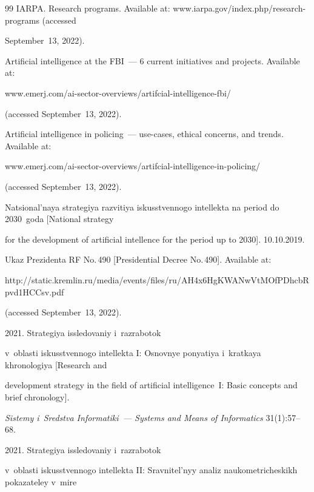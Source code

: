 {{\begin{thebibliography}{99}
IARPA. Research programs. Available at: {\sf www.iarpa.gov/index.php/research-programs} (accessed 

September~13, 2022).


Artificial intelligence at the FBI~--- 6 current initiatives and projects. Available at: {\sf  

www.emerj.com/ai-sector-overviews/artifcial-intelligence-fbi/} (accessed September~13, 2022).


Artificial intelligence in policing~--- use-cases, ethical concerns, and trends. Available at: {\sf 

www.emerj.com/ai-sector-overviews/artifcial-intelligence-in-policing/} (accessed September~13, 2022).


Natsional'naya stra\-te\-giya raz\-vi\-tiya is\-kus\-stven\-no\-go in\-tel\-lek\-ta na pe\-ri\-od do 2030~go\-da [National strategy 

for the development of artificial intellence for the period up to 2030]. 10.10.2019. 

Ukaz Pre\-zi\-den\-ta RF No.\,490 [Presidential Decree No.\,490]. Available at: 

{\sf http://static.kremlin.ru/media/events/files/ru/AH4x6HgKWANwVtMOfPDhcbRpv\linebreak d1HCCsv.pdf} 

(accessed September~13, 2022).


 2021. Stra\-te\-giya is\-sle\-do\-va\-niy i~raz\-ra\-bo\-tok 

v~ob\-lasti is\-kus\-stven\-no\-go in\-tel\-lek\-ta I: Os\-nov\-nye po\-nya\-tiya i~krat\-kaya khro\-no\-lo\-giya [Research and 

development strategy in the field of artificial intelligence~I: Basic concepts and brief chronology]. 

\textit{Sistemy i~Sredstva Informatiki~--- Systems and Means of Informatics} 31(1):57--68.


 2021. Stra\-te\-giya is\-sle\-do\-va\-niy i~raz\-ra\-bo\-tok 

v~ob\-lasti is\-kus\-stven\-no\-go in\-tel\-lek\-ta II: Srav\-ni\-tel'\-nyy ana\-liz nau\-ko\-met\-ri\-che\-skikh po\-ka\-za\-te\-ley v~mire 


\end{thebibliography}}}
